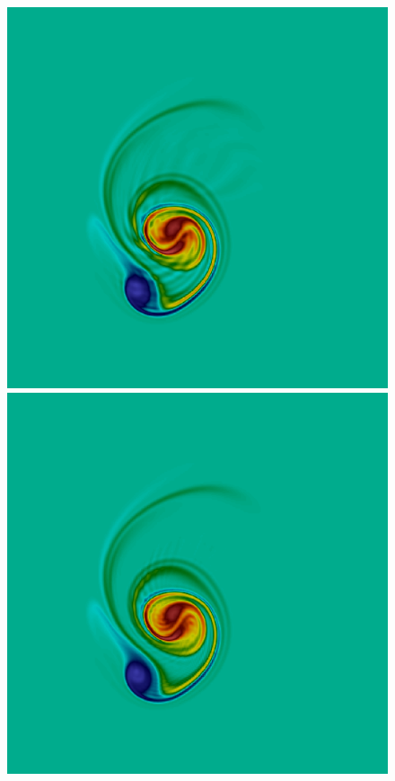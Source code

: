 \begin{figure}[t]
\includegraphics[scale=0.06]{data/Incompressible_Euler/Snapshots/red_17_5.png}\hspace{1em}
\includegraphics[scale=0.06]{data/Incompressible_Euler/Snapshots/red_35_5.png}\hspace{1em}

\end{figure}
